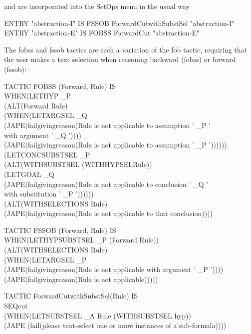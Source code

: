and are incorporated into the SetOps menu in the usual way

ENTRY "abstraction-I" IS FSSOB ForwardCutwithSubstSel "abstraction-I"\\
ENTRY "abstraction-E" IS FOBSS ForwardCut "abstraction-E"


The fobss and fssob tactics are each a variation of the fob tactic, requiring that the user makes a text selection when reasoning backward (fobss) or forward (fssob):

TACTIC FOBSS (Forward, Rule) IS \\
\tab WHEN\tab (LETHYP \_P\\
\tab \tab \tab (ALT\tab (Forward Rule)\\
\tab \tab \tab \tab (WHEN\tab (LETARGSEL \_Q \\
\tab \tab \tab \tab \tab \tab (JAPE(failgivingreason(Rule is not applicable to assumption ' \_P ' \\
\tab \tab \tab \tab \tab \tab \tab \tab \tab \tab with argument ' \_Q '))))\\
\tab \tab \tab \tab \tab (JAPE(failgivingreason(Rule is not applicable to assumption ' \_P ')))))) \\
\tab \tab (LETCONCSUBSTSEL \_P \\
\tab \tab \tab (ALT\tab (WITHSUBSTSEL (WITHHYPSELRule))\\
\tab \tab \tab \tab (LETGOAL \_Q\\
\tab \tab \tab \tab \tab (JAPE(failgivingreason(Rule is not applicable to conclusion ' \_Q '\\
\tab \tab \tab \tab \tab \tab \tab \tab \tab \tab with substitution ' \_P '))))))\\
\tab \tab (ALT\tab (WITHSELECTIONS Rule)\\
\tab \tab \tab (JAPE(failgivingreason(Rule is not applicable to that conclusion))))

TACTIC FSSOB (Forward, Rule) IS \\
\tab WHEN\tab (LETHYPSUBSTSEL \_P (Forward Rule)) \\
\tab \tab (ALT\tab (WITHSELECTIONS Rule)\\
\tab \tab \tab (WHEN\tab (LETARGSEL \_P\\
\tab \tab \tab \tab \tab (JAPE(failgivingreason(Rule is not applicable with argument ' \_P '))))\\
\tab \tab \tab \tab (JAPE(failgivingreason(Rule is not applicable)))))

TACTIC ForwardCutwithSubstSel(Rule) IS\\
\tab SEQ\tab cut \\
\tab \tab (WHEN\tab (LETSUBSTSEL \_A Rule (WITHSUBSTSEL hyp))\\
\tab \tab \tab \tab (JAPE (fail(please text-select one or more instances of a sub-formula))))


